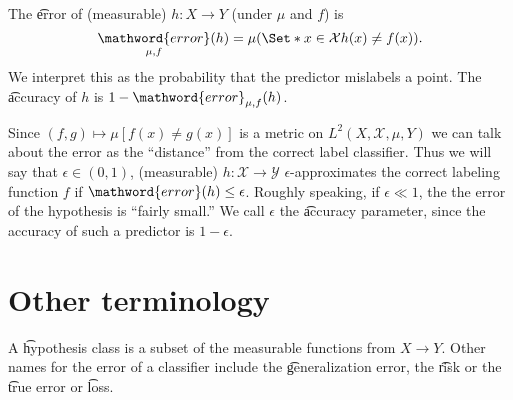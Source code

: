 The \t{error} of (measurable) $h: X \to Y$ (under $\mu $ and $f$) is
\[
\underset{\mu , f}{\mathword{error}}(h) = \mu (\Set*{x \in \mathcal{X} }{h(x) \neq f(x)}).
\]
We interpret this as the probability that the predictor mislabels a point.
The \t{accuracy} of $h$ is $1 - \mathword{error}_{\mu , f}(h)$.

Since $(f, g) \mapsto \mu [f(x) \neq g(x)]$ is a metric on $L^2(X, \mathcal{X} , \mu , Y)$ we can talk about the error as the ``distance'' from the correct label classifier.
Thus we will say that $\epsilon  \in (0, 1)$, (measurable) $h: \mathcal{X}  \to \mathcal{Y} $ \t{$\epsilon $-approximates} the correct labeling function $f$ if $\mathword{error}(h) \leq \epsilon $.
Roughly speaking, if $\epsilon  \ll 1$, the the error of the hypothesis is ``fairly small.''
We call $\epsilon $ the \t{accuracy parameter}, since the accuracy of such a predictor is $1 - \epsilon $.

\section*{Other terminology}

A \t{hypothesis class} is a subset of the measurable functions from $X \to Y$.
Other names for the error of a classifier include the \t{generalization error}, the \t{risk} or the \t{true error} or \t{loss}.
